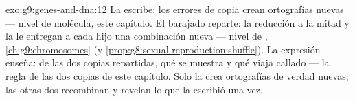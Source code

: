 \begin{solution}{exo:g9:genes-and-dna:12}
La  escribe: los errores de copia crean ortografías nuevas ---
nivel de molécula, este capítulo. El barajado reparte: la reducción a
la mitad y la  le entregan a cada hijo una combinación nueva
--- nivel de , \cref{ch:g9:chromosomes} (y
\cref{prop:g8:sexual-reproduction:shuffle}). La expresión enseña: de
las dos copias repartidas, qué se muestra y qué viaja callado --- la
regla de las dos copias de este capítulo. Solo la  crea
ortografías de verdad nuevas; las otras dos recombinan y revelan lo que
la  escribió una vez.
\end{solution}

